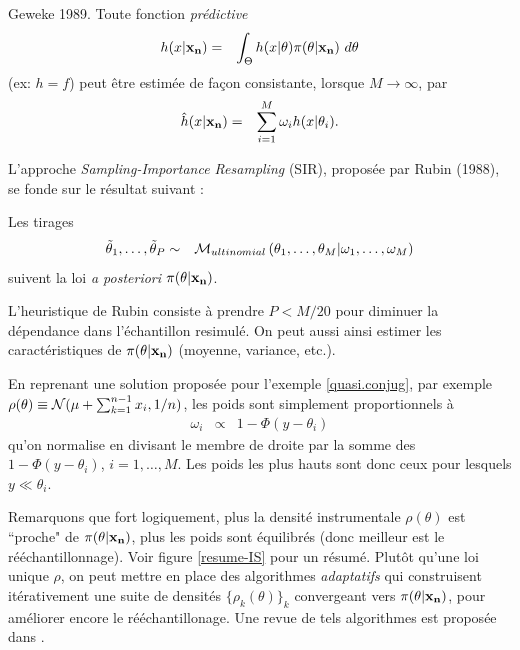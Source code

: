 \begin{theorem}{Geweke 1989.}
Toute fonction {\it prédictive}
\begin{eqnarray*}
h(x|{\bf x_n}) & = & \int_{\Theta} h(x|\theta) \pi(\theta|{\bf x_n}) \ d\theta
\end{eqnarray*}
(ex: $h=f$) peut être estimée de façon consistante, lorsque $M\rightarrow\infty$, par
\begin{eqnarray*}
\hat{h}(x|{\bf x_n}) & = & \sum\limits_{i=1}^M \omega_i h(x|\theta_i).
\end{eqnarray*}
\end{theorem}

L'approche {\it Sampling-Importance Resampling} (SIR), proposée par Rubin (1988), se fonde sur le résultat suivant : 

\begin{theorem}\label{SIR.rubin}
Les tirages
\begin{eqnarray*}
\tilde{\theta}_1,\ldots,\tilde{\theta}_P & \sim & {\cal{M}}_{ultinomial}\left(\theta_1,\ldots,\theta_M|\omega_1,\ldots,\omega_M\right)
\end{eqnarray*}
suivent la loi {\it a posteriori} $\pi(\theta|{\bf x_n})$.
\end{theorem}

L'heuristique de Rubin consiste à prendre $P<M/20$ pour diminuer la dépendance dans l'échantillon resimulé. On peut aussi ainsi estimer les caractéristiques de $\pi(\theta|{\bf x_n})$ (moyenne, variance, etc.). \\

\begin{exo}
En reprenant une solution proposée pour l'exemple \ref{quasi.conjug}, par exemple $\rho(\theta) \equiv {\cal{N}}(\mu + \sum_{k=1}^{n-1} x_i,1/n)$, les poids sont simplement proportionnels à 
\begin{eqnarray*}
\omega_i & \propto & 1-\Phi(y-\theta_i)  
\end{eqnarray*}
qu'on normalise en divisant le membre de droite par la somme des $1-\Phi(y-\theta_i)$, $i=1,\ldots,M$. Les poids les plus hauts sont donc ceux pour lesquels $y \ll \theta_i$. \\
\end{exo}

Remarquons que fort logiquement, plus la densité instrumentale $\rho(\theta)$ est ``proche" de $\pi(\theta|{\bf x_n})$, plus les poids sont équilibrés (donc meilleur est le rééchantillonnage). Voir figure \ref{resume-IS} pour un résumé. Plutôt qu'une loi unique $\rho$, on peut mettre en place des algorithmes {\it adaptatifs} qui construisent itérativement une suite de densités $\{\rho_k(\theta)\}_k$ convergeant vers $\pi(\theta|{\bf x_n})$, pour améliorer encore le rééchantillonage. Une revue de tels algorithmes est proposée dans \cite{Marin2007}.   \\

